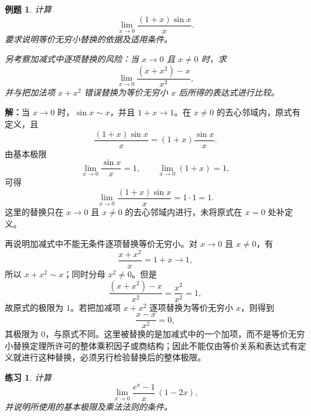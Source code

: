 \documentclass[UTF8,fontset=fandol,11pt]{ctexart}
\newtheorem{example}[definition]{例题}
\newtheorem{exercise}[definition]{练习}
\begin{document}
\begin{example}
计算
\[
\lim_{x\to0}\frac{(1+x)\sin x}{x}.
\]
要求说明等价无穷小替换的依据及适用条件。

另考察加减式中逐项替换的风险：当 $x\to0$ 且 $x\neq0$ 时，求
\[
\lim_{x\to0}\frac{(x+x^2)-x}{x^2},
\]
并与把加法项 $x+x^2$ 错误替换为等价无穷小 $x$ 后所得的表达式进行比较。
\end{example}
\par\noindent\textbf{解：}当 $x\to0$ 时，$\sin x\sim x$，并且 $1+x\to1$。在 $x\neq0$ 的去心邻域内，原式有定义，且
\[
\frac{(1+x)\sin x}{x}=(1+x)\frac{\sin x}{x}.
\]
由基本极限
\[
\lim_{x\to0}\frac{\sin x}{x}=1,
\qquad
\lim_{x\to0}(1+x)=1,
\]
可得
\[
\lim_{x\to0}\frac{(1+x)\sin x}{x}=1\cdot1=1.
\]
这里的替换只在 $x\to0$ 且 $x\neq0$ 的去心邻域内进行，未将原式在 $x=0$ 处补定义。

再说明加减式中不能无条件逐项替换等价无穷小。对 $x\to0$ 且 $x\neq0$，有
\[
\frac{x+x^2}{x}=1+x\longrightarrow1,
\]
所以 $x+x^2\sim x$；同时分母 $x^2\neq0$。但是
\[
\frac{(x+x^2)-x}{x^2}=\frac{x^2}{x^2}=1,
\]
故原式的极限为 $1$。若把加减项 $x+x^2$ 逐项替换为等价无穷小 $x$，则得到
\[
\frac{x-x}{x^2}=0,
\]
其极限为 $0$，与原式不同。这里被替换的是加减式中的一个加项，而不是等价无穷小替换定理所许可的整体乘积因子或商结构；因此不能仅由等价关系和表达式有定义就进行这种替换，必须另行检验替换后的整体极限。\par
\begin{exercise}
\label{mathagent:exercise:410f498083ff9a28d1a2acf9839e74554b434d3445561642fdfe5d3854f06971}
计算
\[
\lim_{x\to0}\frac{e^x-1}{x}\,(1-2x),
\]
并说明所使用的基本极限及乘法法则的条件。
\end{exercise}
\end{document}
